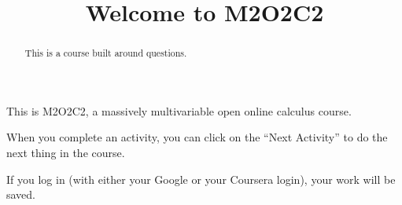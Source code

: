 \documentclass{ximera}
\title{Welcome to M2O2C2}
\begin{document}
\begin{abstract}
  This is a course built around questions.
\end{abstract}

This is M2O2C2, a massively multivariable open online calculus course.

When you complete an activity, you can click on the ``Next Activity'' to do the next thing in the course.

If you log in (with either your Google or your Coursera login), your work will be saved.
\end{document}
